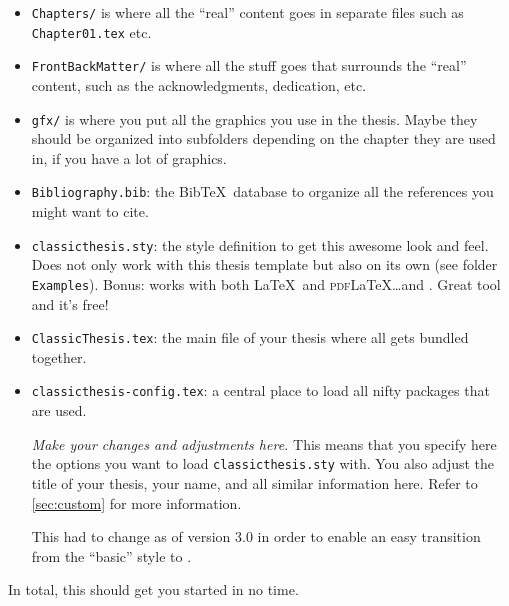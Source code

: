 \begin{itemize}
    \item\texttt{Chapters/} is where all the ``real'' content goes in
          separate files such as \texttt{Chapter01.tex} etc.
    \item\texttt{FrontBackMatter/} is where all the stuff goes that
          surrounds the ``real'' content, such as the acknowledgments,
          dedication, etc.
    \item\texttt{gfx/} is where you put all the graphics you use in
          the thesis. Maybe they should be organized into subfolders
          depending on the chapter they are used in, if you have a lot of
          graphics.
    \item\texttt{Bibliography.bib}: the Bib\TeX\ database to organize
          all the references you might want to cite.
    \item\texttt{classicthesis.sty}: the style definition to get this
          awesome look and feel. Does not only work with this thesis template
          but also on its own (see folder \texttt{Examples}). Bonus: works
          with both \LaTeX\ and \textsc{pdf}\LaTeX\dots and \mLyX.
          Great tool and it's free!
    \item\texttt{ClassicThesis.tex}: the main file of your thesis
          where all gets bundled together.
    \item\texttt{classicthesis-config.tex}: a central place to load all
          nifty packages that are used. %

          \emph{Make your changes and adjustments here.} This means that you
          specify here the options you want to load \texttt{classicthesis.sty}
          with. You also adjust the title of your thesis, your name, and all
          similar information here. Refer to \autoref{sec:custom} for more
          information.

          This had to change as of version 3.0 in order to enable an easy
          transition from the ``basic'' style to \mLyX.
\end{itemize}
In total, this should get you started in no time.


